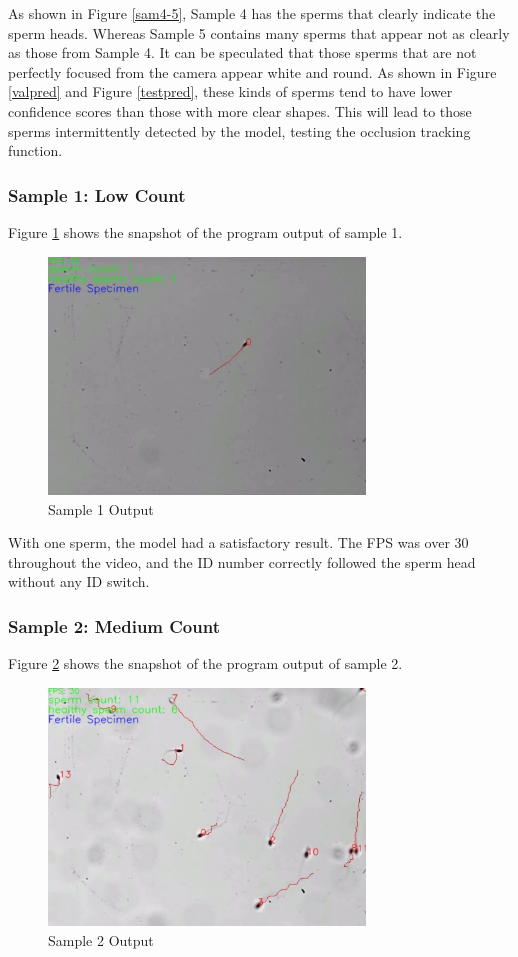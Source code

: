 As shown in Figure \ref{sam4-5}, Sample 4 has the sperms that clearly indicate the sperm heads. Whereas Sample 5 contains many sperms that appear not as clearly as those from Sample 4. It can be speculated that those sperms that are not perfectly focused from the camera appear white and round. As shown in Figure \ref{valpred} and  Figure \ref{testpred}, these kinds of sperms tend to have lower confidence scores than those with more clear shapes. This will lead to those sperms intermittently detected by the model, testing the occlusion tracking function. 

\subsubsection{Sample 1: Low Count}
Figure \ref{sam1res} shows the snapshot of the program output of sample 1. 
\begin{figure}[h]
    \centering
    \includegraphics[width=0.75\textwidth]{Images/sam1.png}
    \caption{Sample 1 Output}
    \label{sam1res}
\end{figure}

With one sperm, the model had a satisfactory result. The FPS was over 30 throughout the video, and the ID number correctly followed the sperm head without any ID switch. 

\newpage
\subsubsection{Sample 2: Medium Count}
Figure \ref{sam2res} shows the snapshot of the program output of sample 2.
\begin{figure}[h]
    \centering
    \includegraphics[width=0.75\textwidth]{Images/sam2.png}
    \caption{Sample 2 Output}
    \label{sam2res}
\end{figure}

